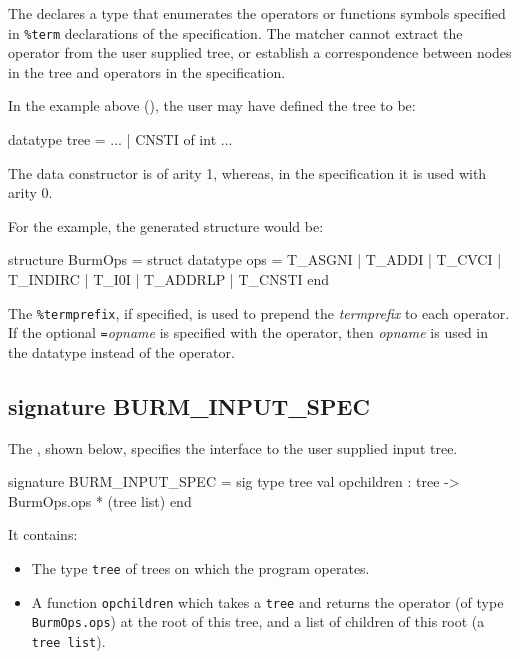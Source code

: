 \documentclass[11pt]{article}
\begin{document}
The  declares a type  that enumerates
the operators or functions symbols specified in {\tt \%term}
declarations of the specification. The matcher cannot extract the
operator from the user supplied tree, or establish a correspondence
between nodes in the tree and operators in the specification.

In the example above (), the user may have
defined the tree to be:
\begin{code}
    datatype tree = ...
                  | CNSTI of int
                  ...
\end{code}
The data constructor  is of arity 1, whereas, in the
specification it is used with arity 0.

For the example, the generated structure would be:

\begin{code}
    structure BurmOps = struct
      datatype ops = 
           T_ASGNI 
         | T_ADDI   
         | T_CVCI 
         | T_INDIRC
         | T_I0I   
         | T_ADDRLP 
         | T_CNSTI
    end
\end{code}

The {\tt \%termprefix}, if specified, is used to prepend the {\sl
termprefix} to each operator. If the optional {\sl {\tt =}opname} is
specified with the operator, then {\sl opname} is used in the
datatype  instead of the operator.

	\subsection{signature BURM\_INPUT\_SPEC}

The , shown below, specifies the
interface to the user supplied input tree.
\begin{code}
    signature BURM_INPUT_SPEC = sig
      type tree
      val opchildren : tree -> BurmOps.ops * (tree list)
    end
\end{code}
It contains:
\begin{itemize}
 \item The type {\tt tree} of trees on which the program operates.

 \item A function {\tt opchildren} which takes a {\tt tree} and returns the
operator (of type {\tt BurmOps.ops}) at the root of this tree, and a list
of children of this root (a {\tt tree list}). 
\end{itemize}
\end{document}
